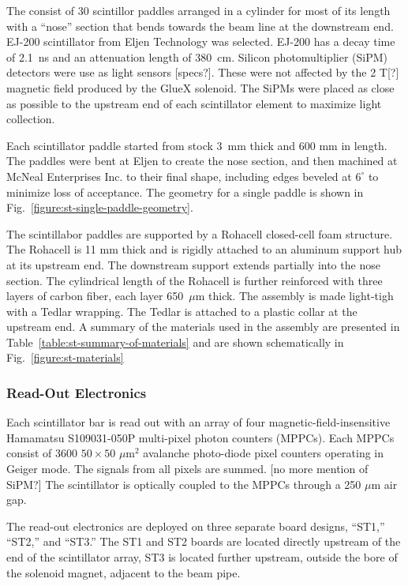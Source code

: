 The \ST consist of 30 scintillor paddles arranged in a cylinder for most of
its length with a ``nose'' section that bends towards the beam line at
the downstream end. EJ-200 scintillator from Eljen
Technology\cite{EljenTech} was selected. EJ-200 has a decay time
of 2.1~ns and an attenuation length of 380~cm. Silicon
photomultiplier (SiPM) detectors were use as light sensors [specs?]. These were
not affected by the 2 T[?] magnetic field produced by the GlueX
solenoid. The SiPMs were placed as close as possible to the upstream
end of each scintillator element to maximize light collection.

Each scintillator paddle started from stock 3~mm thick and 600 mm in
length. The paddles were bent at Eljen to create the nose section, and
then machined at McNeal Enterprises Inc.\cite{mcneal-reference} to
their final shape, including edges beveled at $6^\circ$ to minimize
loss of acceptance. The geometry for a single paddle is shown in
Fig.~\ref{figure:st-single-paddle-geometry}.

The scintillabor paddles are supported by a Rohacell closed-cell foam
structure. The Rohacell is 11 mm thick and is rigidly attached to an
aluminum support hub at its upstream end. The downstream support
extends partially into the nose section. The cylindrical length of the
Rohacell is further reinforced with three layers of carbon fiber, each
layer 650~$\mu$m thick. The assembly is made light-tigh with a Tedlar
wrapping. The Tedlar is attached to a plastic collar at the upstream
end. A summary of the materials used in the assembly are presented in
Table~\ref{table:st-summary-of-materials} and are shown schematically in Fig.~\ref{figure:st-materials}

\subsubsection{Read-Out Electronics}

Each scintillator bar is read out with an array of four
magnetic-field-insensitive Hamamatsu S109031-050P multi-pixel photon
counters (MPPCs)\cite{st-hamamatsu-mppc}. Each MPPCs consist of 3600
$50 \times 50$ $\mu$m$^2$ avalanche photo-diode pixel counters
operating in Geiger mode. The signals from all pixels are summed. [no
  more mention of SiPM?] The scintillator is optically coupled to the
MPPCs through a 250 $\mu$m air gap.

The read-out electronics are deployed on three separate board designs,
``ST1,'' ``ST2,'' and ``ST3.'' The ST1 and ST2 boards are located
directly upstream of the end of the scintillator array, ST3 is located
further upstream, outside the bore of the solenoid magnet, adjacent to
the beam pipe.


